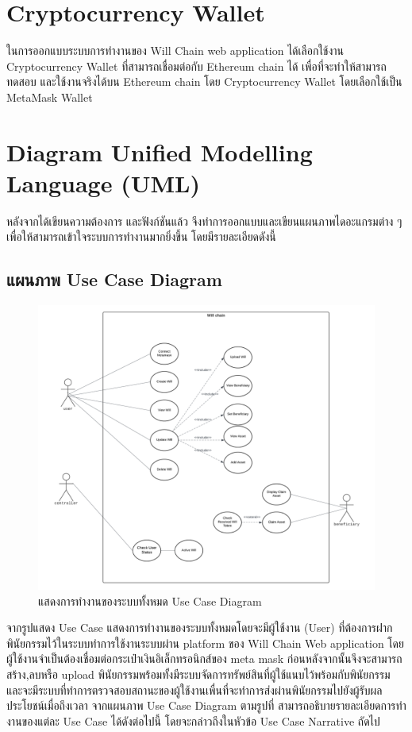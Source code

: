 \documentclass[12pt,oneside,openright,a4paper]{cpe-thai-project}
\begin{document}
\section{Cryptocurrency Wallet}
\tab ในการออกแบบระบบการทํางานของ Will Chain web application ได้เลือกใช้งาน Cryptocurrency Wallet ที่สามารถเชื่อมต่อกับ
Ethereum chain ได้ เพื่อที่จะทําให้สามารถทดสอบ และใช้งานจริงได้บน Ethereum chain โดย Cryptocurrency Wallet โดยเลือกใช้เป็น MetaMask Wallet

\section{Diagram Unified Modelling Language (UML)}
\tab หลังจากได้เขียนความต้องการ และฟังก์ชันแล้ว จึงทำการออกแบบและเขียนแผนภาพไดอะแกรมต่าง ๆ เพื่อให้สามารถเข้าใจระบบการทำงานมากยิ่งขึ้น โดยมีรายละเอียดดังนี้

\subsection{แผนภาพ Use Case Diagram}
	\begin{figure}[!htb]
		\centering
		\includegraphics[scale=0.5]{UseCaseDiagram}
		\caption{แสดงการทำงานของระบบทั้งหมด Use Case Diagram}
	\end{figure}
\FloatBarrier
\tab จากรูปแสดง Use Case แสดงการทำงานของระบบทั้งหมดโดยจะมีผู้ใช้งาน (User) ที่ต้องการฝากพินัยกรรมไว้ในระบบทำการใช้งานระบบผ่าน platform ของ Will Chain Web application  โดยผู้ใช้งานจำเป็นต้องเชื่อมต่อกระเป๋าเงินอิเล็กทรอนิกส์ของ meta mask ก่อนหลังจากนั้นจึงจะสามารถ สร้าง,ลบหรือ upload พินัยกรรมพร้อมทั้งมีระบบจัดการทรัพย์สินที่ผู้ใช้แนบไว้พร้อมกับพินัยกรรม และจะมีระบบที่ทำการตรวจสอบสถานะของผู้ใช้งานเพื่นที่จะทำการส่งผ่านพินัยกรรมไปยังผู้รับผลประโยชน์เมื่อถึงเวลา   จากแผนภาพ Use Case Diagram ตามรูปที่ สามารถอธิบายรายละเอียดการทํา งานของแต่ละ Use Case ได้ดังต่อไปนี้ โดยจะกล่าวถึงในหัวข้อ Use Case Narrative ถัดไป
\clearpage
\end{document}
